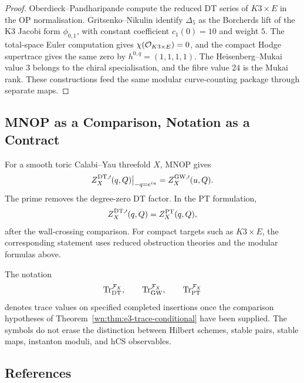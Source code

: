 \begin{proof}
Oberdieck--Pandharipande compute the reduced DT series of
\(K3\times E\) in the OP normalisation.  Gritsenko--Nikulin identify
\(\Delta_{5}\) as the Borcherds lift of the K3 Jacobi form
\(\phi_{0,1}\), with constant coefficient \(c_1(0)=10\) and weight
\(5\).  The total-space Euler computation gives
\(\chi(\mathcal{O}_{K3\times E})=0\), and the compact Hodge supertrace gives
the same zero by \(h^{0,q}=(1,1,1,1)\).  The Heisenberg--Mukai value
\(3\) belongs to the chiral specialisation, and the fibre value \(24\)
is the Mukai rank.  These constructions feed the same modular
curve-counting package through separate maps.
\end{proof}

\subsection*{MNOP as a Comparison, Notation as a Contract}
\label{subsec:mnop-comparison-contract}

For a smooth toric Calabi--Yau threefold \(X\), MNOP gives
\[
  Z^{\mathrm{DT},\prime}_X(q,Q)\big|_{-q=e^{iu}}
  =
  Z^{\mathrm{GW},\prime}_X(u,Q).
\]
The prime removes the degree-zero DT factor.  In the PT formulation,
\[
  Z^{\mathrm{DT},\prime}_X(q,Q)=Z^{\mathrm{PT}}_X(q,Q),
\]
after the wall-crossing comparison.  For compact targets such as
\(K3\times E\), the corresponding statement uses reduced obstruction
theories and the modular formulas above.

The notation
\[
  \mathrm{Tr}^{\mathcal{F}_X}_{\mathrm{DT}},\qquad
  \mathrm{Tr}^{\mathcal{F}_X}_{\mathrm{GW}},\qquad
  \mathrm{Tr}^{\mathcal{F}_X}_{\mathrm{PT}}
\]
denotes trace values on specified completed insertions once the
comparison hypotheses of Theorem~\ref{wn:thm:e3-trace-conditional}
have been supplied.  The symbols do not erase the distinction between
Hilbert schemes, stable pairs, stable maps, instanton moduli, and
hCS observables.

\subsection*{References}
\label{subsec:dt-e3-references}

